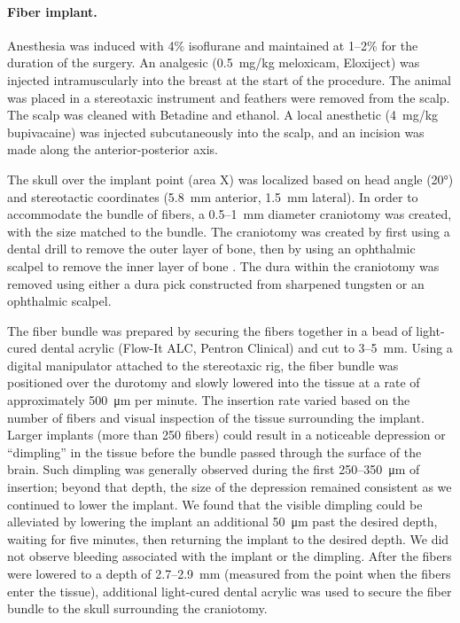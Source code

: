 \paragraph{Fiber implant.} Anesthesia was induced with 4\% isoflurane 
and maintained at 1--2\% for the duration of the surgery. An analgesic 
(0.5~mg/kg meloxicam, Eloxiject) was injected intramuscularly into the 
breast at the start of the procedure. The animal was placed in a 
stereotaxic instrument and feathers were removed from the scalp. The 
scalp was cleaned with Betadine and ethanol. A local anesthetic 
(4~mg/kg bupivacaine) was injected subcutaneously into the scalp, and 
an incision was made along the anterior-posterior axis.

The skull over the implant point (area X) was localized based on head 
angle (\ang{20}) and stereotactic coordinates (5.8~mm anterior, 1.5~mm 
lateral). In order to accommodate the bundle of fibers, a 0.5--1~mm 
diameter craniotomy was created, with the size matched to the bundle. 
The craniotomy was created by first using a dental drill to remove the 
outer layer of bone, then by using an ophthalmic scalpel to remove the 
inner layer of bone \cite{Long:2010db}. The dura within the craniotomy 
was removed using either a dura pick constructed from sharpened 
tungsten or an ophthalmic scalpel.

The fiber bundle was prepared by securing the fibers together in a 
bead of light-cured 
dental acrylic (Flow-It ALC, Pentron Clinical) and cut to 3--5~mm. Using 
a digital manipulator attached to the stereotaxic rig, the fiber bundle 
was positioned over the durotomy and slowly lowered into the tissue at 
a rate of approximately 500~\si{\micro\meter} per minute. The insertion rate varied 
based on the number of fibers and visual inspection of the tissue 
surrounding the implant. Larger implants (more than 250 fibers) could 
result in a noticeable depression or ``dimpling'' in the tissue before 
the bundle passed through the surface of the brain. Such dimpling was 
generally observed during the first 250--350~\si{\micro\meter} of 
insertion; beyond that depth, the size of the depression remained 
consistent as we continued to lower the implant. We found that the 
visible dimpling could be alleviated by lowering the implant an 
additional 50~\si{\micro\meter} past the desired depth, waiting for five 
minutes, then returning the implant to the desired depth. We did not 
observe bleeding 
associated with the implant or the dimpling. After the fibers 
were lowered to a depth of 2.7--2.9~mm (measured from the point when the 
fibers enter the tissue), additional light-cured dental acrylic was used 
to secure the fiber bundle to the skull surrounding the craniotomy. 

